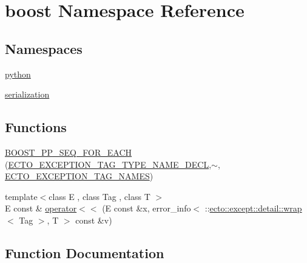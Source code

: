 \hypertarget{namespaceboost}{}\section{boost Namespace Reference}
\label{namespaceboost}
\subsection*{Namespaces}
\begin{DoxyCompactItemize}
\item 
 \hyperlink{namespaceboost_1_1python}{python}
\item 
 \hyperlink{namespaceboost_1_1serialization}{serialization}
\end{DoxyCompactItemize}
\subsection*{Functions}
\begin{DoxyCompactItemize}
\item 
\hyperlink{namespaceboost_ac098a4e20f2e80e827e2022ad264473a}{B\+O\+O\+S\+T\+\_\+\+P\+P\+\_\+\+S\+E\+Q\+\_\+\+F\+O\+R\+\_\+\+E\+A\+CH} (\hyperlink{except_8hpp_a61f61285d4749b701b559d10678908a4}{E\+C\+T\+O\+\_\+\+E\+X\+C\+E\+P\+T\+I\+O\+N\+\_\+\+T\+A\+G\+\_\+\+T\+Y\+P\+E\+\_\+\+N\+A\+M\+E\+\_\+\+D\+E\+CL},$\sim$, \hyperlink{except_8hpp_a6a632b3827deba566cbca48b37bf53e2}{E\+C\+T\+O\+\_\+\+E\+X\+C\+E\+P\+T\+I\+O\+N\+\_\+\+T\+A\+G\+\_\+\+N\+A\+M\+ES})
\item 
{\footnotesize template$<$class E , class Tag , class T $>$ }\\E const \& \hyperlink{namespaceboost_a50253cbebddb80700be930287ab2fcde}{operator$<$$<$} (E const \&x, error\+\_\+info$<$ \+::\hyperlink{structecto_1_1except_1_1detail_1_1wrap}{ecto\+::except\+::detail\+::wrap}$<$ Tag $>$, T $>$ const \&v)
\end{DoxyCompactItemize}


\subsection{Function Documentation}
